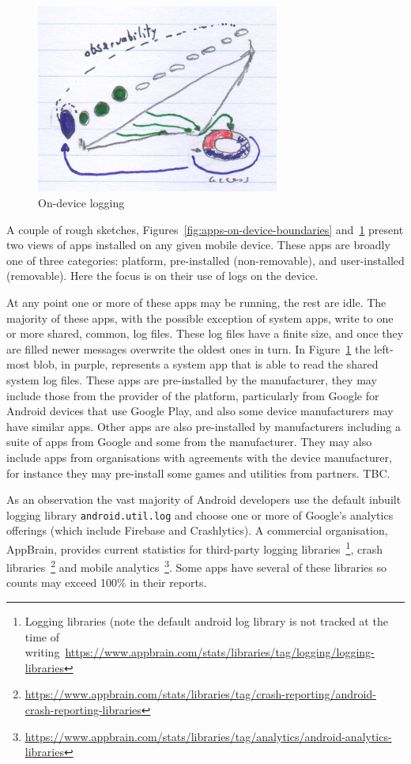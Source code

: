 \begin{figure}
    \centering
    \includegraphics[width=8cm]{images/rough-sketches/on-device-logging-sketch.jpeg}
    \caption{On-device logging}
    \label{fig:on-device-logging}
\end{figure}

A couple of rough sketches, Figures~\ref{fig:apps-on-device-boundaries} and~\ref{fig:on-device-logging} present two views of apps installed on any given mobile device. These apps are broadly one of three categories: platform, pre-installed (non-removable), and user-installed (removable). Here the focus is on their use of logs on the device.

At any point one or more of these apps may be running, the rest are idle. The majority of these apps, with the possible exception of system apps, write to one or more shared, common, log files. These log files have a finite size, and once they are filled newer messages overwrite the oldest ones in turn. In Figure~\ref{fig:on-device-logging} the left-most blob, in purple, represents a system app that is able to read the shared system log files. These apps are pre-installed by the manufacturer, they may include those from the provider of the platform, particularly from Google for Android devices that use Google Play, and also some device manufacturers may have similar apps. Other apps are also pre-installed by manufacturers including a suite of apps from Google and some from the manufacturer. They may also include apps from organisations with agreements with the device manufacturer, for instance they may pre-install some games and utilities from partners. TBC.


As an observation the vast majority of Android developers use the default inbuilt logging library \texttt{android.util.log} and choose one or more of Google's analytics offerings (which include Firebase and Crashlytics). A commercial organisation, AppBrain, provides current statistics for third-party logging libraries~\footnote{Logging libraries (note the default android log library is not tracked at the time of writing~\url{https://www.appbrain.com/stats/libraries/tag/logging/logging-libraries}}, crash libraries~\footnote{\url{https://www.appbrain.com/stats/libraries/tag/crash-reporting/android-crash-reporting-libraries}} and mobile analytics~\footnote{\url{https://www.appbrain.com/stats/libraries/tag/analytics/android-analytics-libraries}}. Some apps have several of these libraries so counts may exceed 100\% in their reports.

